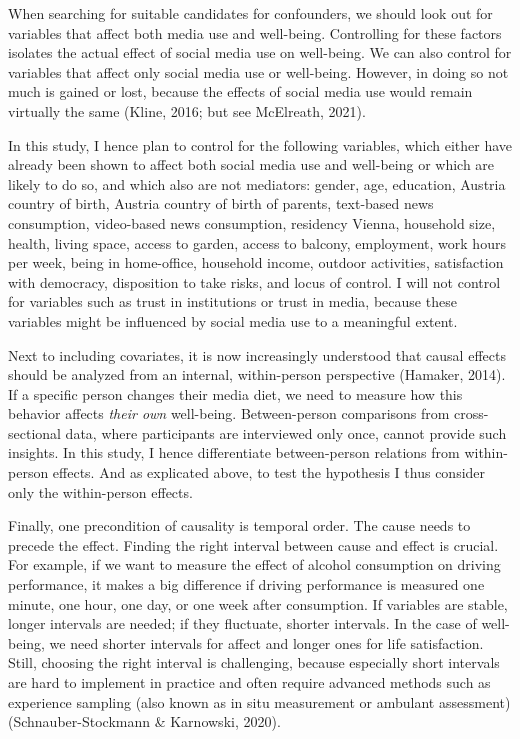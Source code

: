 \documentclass[
  english,
  man,mask,floatsintext]{apa6}
\begin{document}
When searching for suitable candidates for confounders, we should look out for variables that affect both media use and well-being.
Controlling for these factors isolates the actual effect of social media use on well-being.
We can also control for variables that affect only social media use or well-being.
However, in doing so not much is gained or lost, because the effects of social media use would remain virtually the same (Kline, 2016; but see McElreath, 2021).

In this study, I hence plan to control for the following variables, which either have already been shown to affect both social media use and well-being or which are likely to do so, and which also are not mediators:
gender, age, education, Austria country of birth, Austria country of birth of parents, text-based news consumption, video-based news consumption, residency Vienna, household size, health, living space, access to garden, access to balcony, employment, work hours per week, being in home-office, household income, outdoor activities, satisfaction with democracy, disposition to take risks, and locus of control.
I will not control for variables such as trust in institutions or trust in media, because these variables might be influenced by social media use to a meaningful extent.

Next to including covariates, it is now increasingly understood that causal effects should be analyzed from an internal, within-person perspective (Hamaker, 2014).
If a specific person changes their media diet, we need to measure how this behavior affects \emph{their own} well-being.
Between-person comparisons from cross-sectional data, where participants are interviewed only once, cannot provide such insights.
In this study, I hence differentiate between-person relations from within-person effects.
And as explicated above, to test the hypothesis I thus consider only the within-person effects.

Finally, one precondition of causality is temporal order.
The cause needs to precede the effect.
Finding the right interval between cause and effect is crucial.
For example, if we want to measure the effect of alcohol consumption on driving performance, it makes a big difference if driving performance is measured one minute, one hour, one day, or one week after consumption.
If variables are stable, longer intervals are needed; if they fluctuate, shorter intervals.
In the case of well-being, we need shorter intervals for affect and longer ones for life satisfaction.
Still, choosing the right interval is challenging, because especially short intervals are hard to implement in practice and often require advanced methods such as experience sampling (also known as in situ measurement or ambulant assessment) (Schnauber-Stockmann \& Karnowski, 2020).
\end{document}
